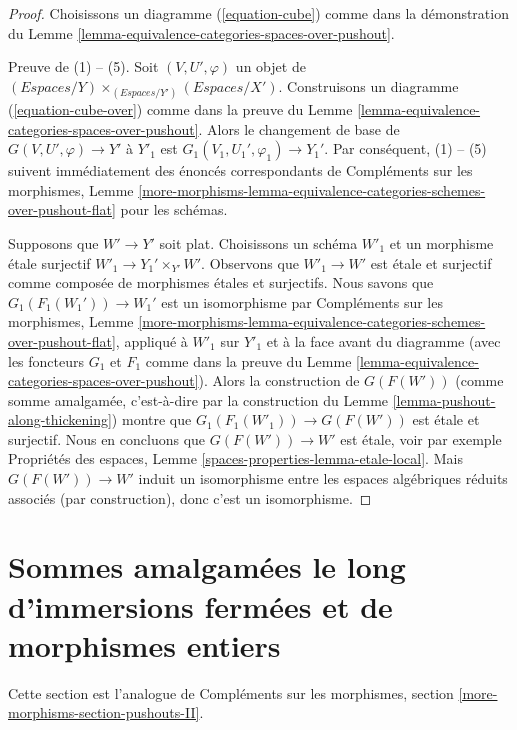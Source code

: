 \begin{proof}
Choisissons un diagramme (\ref{equation-cube}) comme dans la démonstration du
Lemme \ref{lemma-equivalence-categories-spaces-over-pushout}.

\medskip\noindent
Preuve de (1) -- (5). Soit $(V, U', \varphi)$ un objet de
$(\textit{Espaces}/Y) \times_{(\textit{Espaces}/Y')} (\textit{Espaces}/X')$.
Construisons un diagramme (\ref{equation-cube-over}) comme dans la preuve du
Lemme \ref{lemma-equivalence-categories-spaces-over-pushout}.
Alors le changement de base de $G(V, U', \varphi) \to Y'$ à
$Y'_1$ est $G_1(V_1, U_1', \varphi_1) \to Y_1'$. Par conséquent, (1) -- (5)
suivent immédiatement des énoncés correspondants de Compléments sur les morphismes, Lemme
\ref{more-morphisms-lemma-equivalence-categories-schemes-over-pushout-flat}
pour les schémas.

\medskip\noindent
Supposons que $W' \to Y'$ soit plat. Choisissons un schéma $W'_1$ et un morphisme \'etale surjectif $W'_1 \to Y_1' \times_{Y'} W'$. Observons que $W'_1 \to W'$ est \'etale et surjectif comme composée de morphismes \'etales et surjectifs. Nous savons que $G_1(F_1(W_1')) \to W_1'$ est un isomorphisme par Compléments sur les morphismes, Lemme \ref{more-morphisms-lemma-equivalence-categories-schemes-over-pushout-flat}, appliqué à $W'_1$ sur $Y'_1$ et à la face avant du diagramme (avec les foncteurs $G_1$ et $F_1$ comme dans la preuve du Lemme \ref{lemma-equivalence-categories-spaces-over-pushout}).
Alors la construction de $G(F(W'))$ (comme somme amalgamée, c'est-à-dire par la construction du Lemme \ref{lemma-pushout-along-thickening}) montre que $G_1(F_1(W'_1)) \to G(F(W'))$ est \'etale et surjectif. Nous en concluons que $G(F(W')) \to W'$ est \'etale, voir par exemple Propriétés des espaces, Lemme \ref{spaces-properties-lemma-etale-local}.
Mais $G(F(W')) \to W'$ induit un isomorphisme entre les espaces algébriques réduits associés (par construction), donc c'est un isomorphisme.
\end{proof}







\section{Sommes amalgamées le long d'immersions fermées et de morphismes entiers}
\label{section-pushouts-II}

\noindent
Cette section est l'analogue de
Compléments sur les morphismes, section \ref{more-morphisms-section-pushouts-II}.

